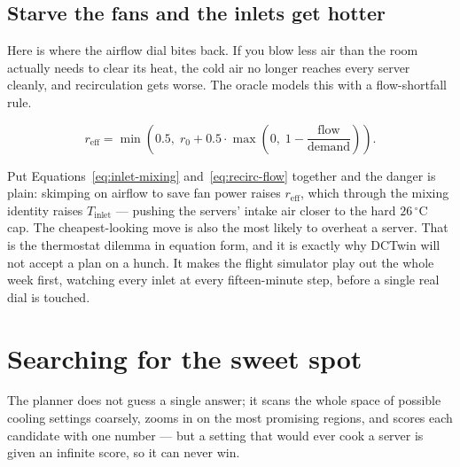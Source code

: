 \subsection*{Starve the fans and the inlets get hotter}

Here is where the airflow dial bites back. If you blow less air than the room actually needs to clear its heat, the cold air no longer reaches every server cleanly, and recirculation gets worse. The oracle models this with a flow-shortfall rule.

\begin{equation}\label{eq:recirc-flow}
r_{\text{eff}} = \min\!\left(0.5,\; r_0 + 0.5 \cdot \max\!\left(0,\; 1 - \frac{\text{flow}}{\text{demand}}\right)\right).
\end{equation}

Put Equations~\ref{eq:inlet-mixing} and~\ref{eq:recirc-flow} together and the danger is plain: skimping on airflow to save fan power raises $r_{\text{eff}}$, which through the mixing identity raises $T_{\text{inlet}}$ --- pushing the servers' intake air closer to the hard $26\,^\circ$C cap. The cheapest-looking move is also the most likely to overheat a server. That is the thermostat dilemma in equation form, and it is exactly why DCTwin will not accept a plan on a hunch. It makes the flight simulator play out the whole week first, watching every inlet at every fifteen-minute step, before a single real dial is touched.

\section{Searching for the sweet spot}
\label{sec:search}

\begin{keyidea}
The planner does not guess a single answer; it scans the whole space of possible cooling settings coarsely, zooms in on the most promising regions, and scores each candidate with one number --- but a setting that would ever cook a server is given an infinite score, so it can never win.
\end{keyidea}


